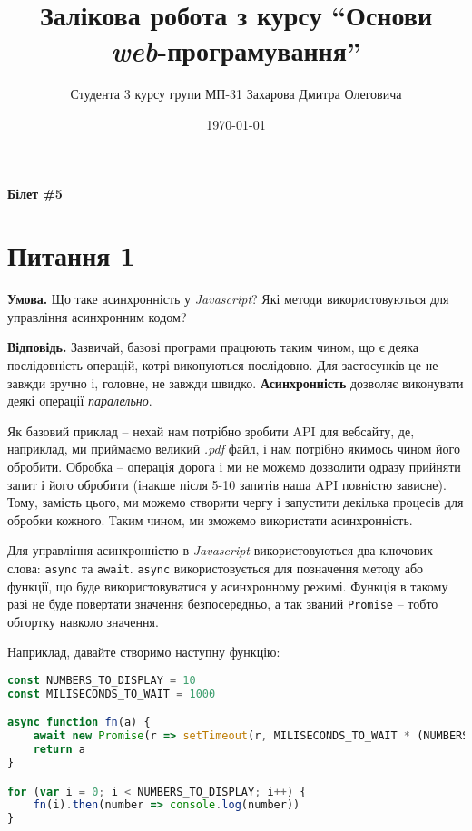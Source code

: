\documentclass[12pt]{extarticle}
\title{Залікова робота з курсу ``Основи \textit{web}-програмування''}
\author{Студента 3 курсу групи МП-31 Захарова Дмитра Олеговича}
\date{\today}
\begin{document}
\maketitle

\begin{center}
\textbf{Білет \#5}
\end{center}

\section*{Питання 1} 

\textbf{Умова.} Що таке асинхронність у \textit{Javascript}? Які методи використовуються для управління асинхронним кодом?

\textbf{Відповідь.} Зазвичай, базові програми працюють таким чином, що є деяка послідовність операцій, котрі виконуються послідовно. Для застосунків це не завжди зручно і, головне, не завжди швидко. \textbf{Асинхронність} дозволяє виконувати деякі операції \textit{паралельно}. 

Як базовий приклад -- нехай нам потрібно зробити API для вебсайту, де, наприклад, ми приймаємо великий \textit{.pdf} файл, і нам потрібно якимось чином його обробити. Обробка -- операція дорога і ми не можемо дозволити одразу прийняти запит і його обробити (інакше після 5-10 запитів наша API повністю зависне). Тому, замість цього, ми можемо створити чергу і запустити декілька процесів для обробки кожного. Таким чином, ми зможемо використати асинхронність.

Для управління асинхронністю в \textit{Javascript} використовуються два ключових слова: \texttt{async} та \texttt{await}. \texttt{async} використовується для позначення методу або функції, що буде використовуватися у асинхронному режимі. Функція в такому разі не буде повертати значення безпосередньо, а так званий \texttt{Promise} -- тобто обгортку навколо значення. 

Наприклад, давайте створимо наступну функцію:

\begin{lstlisting}[language=javascript, caption=Створення асинхронної функції]
const NUMBERS_TO_DISPLAY = 10
const MILISECONDS_TO_WAIT = 1000

async function fn(a) {
    await new Promise(r => setTimeout(r, MILISECONDS_TO_WAIT * (NUMBERS_TO_DISPLAY - a)))
    return a
}

for (var i = 0; i < NUMBERS_TO_DISPLAY; i++) {
    fn(i).then(number => console.log(number))
}
\end{lstlisting}
\end{document}
